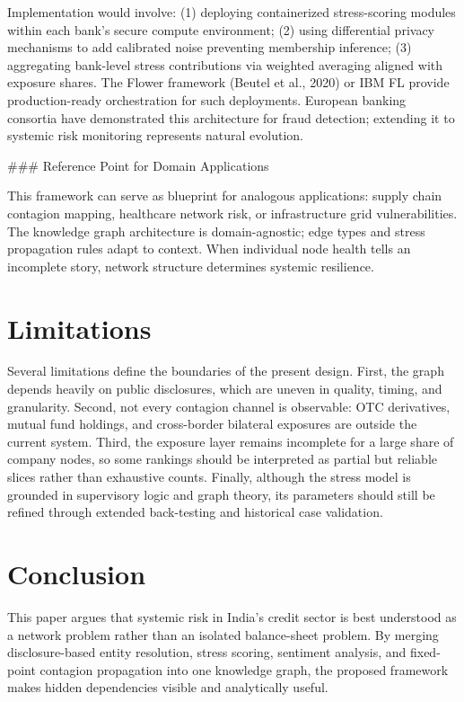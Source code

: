 \documentclass[12pt]{article}
\begin{document}
Implementation would involve: (1) deploying containerized stress-scoring modules within each bank's secure compute environment; (2) using differential privacy mechanisms to add calibrated noise preventing membership inference; (3) aggregating bank-level stress contributions via weighted averaging aligned with exposure shares. The Flower framework (Beutel et al., 2020) or IBM FL provide production-ready orchestration for such deployments. European banking consortia have demonstrated this architecture for fraud detection; extending it to systemic risk monitoring represents natural evolution.

### Reference Point for Domain Applications

This framework can serve as blueprint for analogous applications: supply chain contagion mapping, healthcare network risk, or infrastructure grid vulnerabilities. The knowledge graph architecture is domain-agnostic; edge types and stress propagation rules adapt to context. When individual node health tells an incomplete story, network structure determines systemic resilience.

\section*{Limitations}

Several limitations define the boundaries of the present design. First, the graph depends heavily on public disclosures, which are uneven in quality, timing, and granularity. Second, not every contagion channel is observable: OTC derivatives, mutual fund holdings, and cross-border bilateral exposures are outside the current system. Third, the exposure layer remains incomplete for a large share of company nodes, so some rankings should be interpreted as partial but reliable slices rather than exhaustive counts. Finally, although the stress model is grounded in supervisory logic and graph theory, its parameters should still be refined through extended back-testing and historical case validation.

\section*{Conclusion}

This paper argues that systemic risk in India's credit sector is best understood as a network problem rather than an isolated balance-sheet problem. By merging disclosure-based entity resolution, stress scoring, sentiment analysis, and fixed-point contagion propagation into one knowledge graph, the proposed framework makes hidden dependencies visible and analytically useful.
\end{document}
